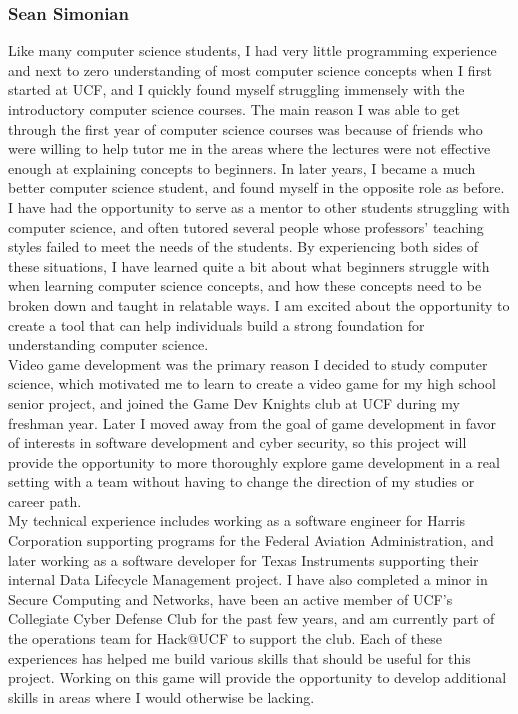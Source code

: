 \documentclass{article}
\begin{document}
\subsubsection{Sean Simonian}
Like many computer science students, I had very little programming experience
and next to zero understanding of most computer science concepts when I first
started at UCF, and I quickly found myself struggling immensely with the
introductory computer science courses. The main reason I was able to get through
the first year of computer science courses was because of friends who were
willing to help tutor me in the areas where the lectures were not effective
enough at explaining concepts to beginners. In later years, I became a much
better computer science student, and found myself in the opposite role as
before. I have had the opportunity to serve as a mentor to other students
struggling with computer science, and often tutored several people whose
professors’ teaching styles failed to meet the needs of the students. By
experiencing both sides of these situations, I have learned quite a bit about
what beginners struggle with when learning computer science concepts, and how
these concepts need to be broken down and taught in relatable ways. I am excited
about the opportunity to create a tool that can help individuals build a strong
foundation for understanding computer science.\\

Video game development was the primary reason I decided to study computer
science, which motivated me to learn to create a video game for my high school
senior project, and joined the Game Dev Knights club at UCF during my freshman
year. Later I moved away from the goal of game development in favor of interests
in software development and cyber security, so this project will provide the
opportunity to more thoroughly explore game development in a real setting with a
team without having to change the direction of my studies or career path.\\

My technical experience includes working as a software engineer for Harris
Corporation supporting programs for the Federal Aviation Administration, and
later working as a software developer for Texas Instruments supporting their
internal Data Lifecycle Management project. I have also completed a minor in
Secure Computing and Networks, have been an active member of UCF’s Collegiate
Cyber Defense Club for the past few years, and am currently part of the
operations team for Hack@UCF to support the club. Each of these experiences has
helped me build various skills that should be useful for this project. Working
on this game will provide the opportunity to develop additional skills in areas
where I would otherwise be lacking.
\end{document}
